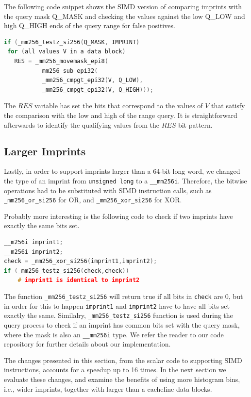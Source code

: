 \documentclass[sigconf]{acmart}
\begin{document}
The following code snippet shows the SIMD version of comparing imprints with the query mask Q\_MASK and checking the values against the low Q\_LOW and high Q\_HIGH ends of the query range for false positives.

\begin{lstlisting}[language=c]
if (_mm256_testz_si256(Q_MASK, IMPRINT)
 for (all values V in a data block)
   RES = _mm256_movemask_epi8(
          _mm256_sub_epi32(
           _mm256_cmpgt_epi32(V, Q_LOW),
           _mm256_cmpgt_epi32(V, Q_HIGH)));
\end{lstlisting}

The $RES$ variable has set the bits that correspond to the values of $V$ that satisfy the comparison with the low and high of the range query.
It is straightforward afterwards to identify the qualifying values from the $RES$ bit pattern.

\subsection{Larger Imprints}

Lastly, in order to support imprints larger than a 64-bit long word, we changed the type of an imprint from
\texttt{unsigned long} to a \texttt{\_\_mm256i}. Therefore, the bitwise operations had to be substituted with
SIMD instruction calls, such as \texttt{\_mm256\_or\_si256} for OR, and \texttt{\_mm256\_xor\_si256} for XOR.

Probably more interesting is the following code to check if two imprints have exactly the same bits set.

\begin{lstlisting}[language=c]
__m256i imprint1;
__m256i imprint2;
check = _mm256_xor_si256(imprint1,imprint2);
if (_mm256_testz_si256(check,check))
    # imprint1 is identical to imprint2 
\end{lstlisting}

The function \texttt{\_mm256\_testz\_si256} will return true if all bits in \texttt{check} are 0, but in order for
this to happen \texttt{imprint1} and \texttt{imprint2} have to have all bits set exactly the same.
Similalry, \texttt{\_mm256\_testz\_si256} function is used during the query process to check if an imprint has common
bits set with the query mask, where the mask is also an \texttt{\_\_mm256i} type. We refer the reader to our code 
repository for further details about our implementation.

The changes presented in this section, from the scalar code to supporting SIMD instructions, accounts for a speedup up to 16 times.
In the next section we evaluate these changes, and examine the benefits of using more histogram bins, i.e., wider imprints, together
with larger than a cacheline data blocks. 
\end{document}
